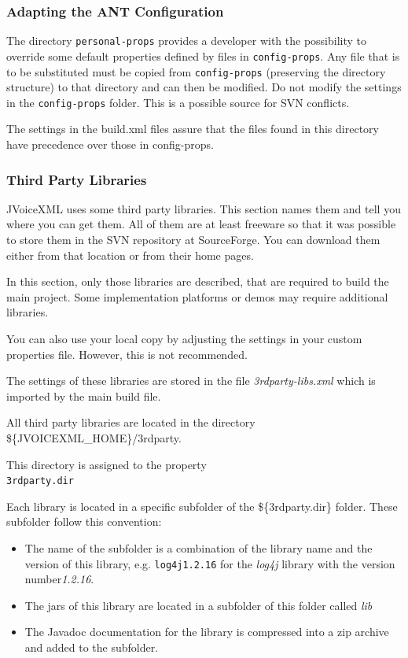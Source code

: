 \documentclass[11pt,a4paper]{article}
\begin{document}
\subsubsection{Adapting the ANT Configuration}
\label{sec:adapt-ant}

The directory \texttt{personal-props} provides a developer with the 
possibility to override some 
default properties defined by files in \texttt{config-props}. 
Any file that is to be
substituted must be copied from \texttt{config-props} 
(preserving the directory structure) to that directory and can then be 
modified. Do not modify the settings in the \texttt{config-props} folder. This
is a possible source for SVN conflicts.

The settings in the build.xml files assure that the files
found in this directory have precedence over those in config-props.

\subsubsection{Third Party Libraries}
\label{sec:third-party-libr}

JVoiceXML uses some third party libraries. This section names them and tell
you where you can get them. All of them are at least freeware
so that it was possible to store them in the SVN repository at
SourceForge. You can download them either from that location or
from their home pages. 

In this section, only those libraries are described, that are required
to build the main project. Some implementation platforms or demos may
require additional libraries.

You can also use your local copy by adjusting the settings in your
custom properties file. However, this is not recommended.

The settings of these libraries are stored in the file \emph{3rdparty-libs.xml}
which is imported by the main build file.

All third party libraries are located in the directory \\
\$\{JVOICEXML\_HOME\}/3rdparty.

This directory is assigned to the property \\
\texttt{3rdparty.dir}

Each library is located in a specific subfolder of the \$\{3rdparty.dir\}
folder. These subfolder follow this convention:

\begin{itemize}
\item The name of the subfolder is a combination of the library name and
the version of this library, e.g. \texttt{log4j1.2.16} for the \emph{log4j}
library with the version number\emph{1.2.16}.
\item The jars of this library are located in a subfolder of this folder
called \emph{lib}
\item The Javadoc documentation for the library is compressed into a zip
archive and added to the subfolder.
\end{itemize}
\end{document}
